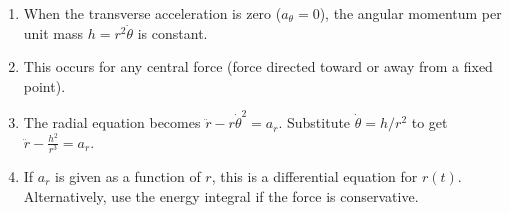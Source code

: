 \documentclass[11pt]{article}
\begin{document}
\begin{methode}
\begin{enumerate}
\item When the transverse acceleration is zero ($a_\theta = 0$), the angular momentum per unit mass $h = r^2\dot{\theta}$ is constant.
\item This occurs for any central force (force directed toward or away from a fixed point).
\item The radial equation becomes $\ddot{r} - r\dot{\theta}^2 = a_r$. Substitute $\dot{\theta} = h/r^2$ to get $\ddot{r} - \frac{h^2}{r^3} = a_r$.
\item If $a_r$ is given as a function of $r$, this is a differential equation for $r(t)$. Alternatively, use the energy integral if the force is conservative.
\end{enumerate}
\end{methode}
\end{document}
